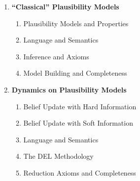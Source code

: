 \documentclass[letterpaper]{article}
\begin{document}
\begin{enumerate}[label=\Alph*]
    \item \textbf{``Classical'' Plausibility Models}
    \begin{enumerate}
        \item Plausibility Models and Properties
        \item Language and Semantics
        \item Inference and Axioms
        \item Model Building and Completeness
    \end{enumerate}
    
    \item \textbf{Dynamics on Plausibility Models}
    \begin{enumerate}
        \item Belief Update with Hard Information
        \item Belief Update with Soft Information
        \item Language and Semantics
        \item The DEL Methodology
        \item Reduction Axioms and Completeness
    \end{enumerate}

\end{enumerate}




\end{document}
